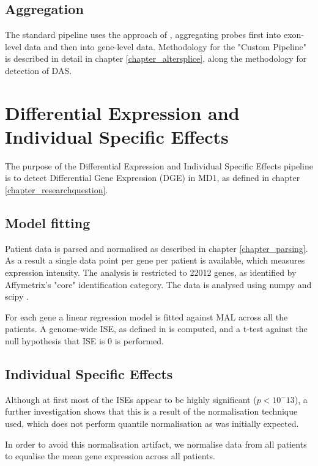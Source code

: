 \subsection{Aggregation}
The standard pipeline uses the approach of \cite{McCall2012}, aggregating probes first into exon-level data and then into gene-level data. Methodology for the "Custom Pipeline" is described in detail in chapter \ref{chapter_altersplice}, along the methodology for detection of DAS.

\section{Differential Expression and Individual Specific Effects} \label {chapter_DE}

The purpose of the Differential Expression and Individual Specific Effects pipeline is to detect Differential Gene Expression (DGE) in MD1, as defined in chapter \ref{chapter_researchquestion}.

\subsection{Model fitting} \label{section_modelfitting}

Patient data is parsed and normalised as described in chapter \ref{chapter_parsing}. As a result a single data point per gene per patient is available, which measures expression intensity. The analysis is restricted to 22012 genes, as identified by Affymetrix's "core" identification category. The data is analysed using numpy and scipy \parencite{Scipy2017}. 

For each gene a linear regression model is fitted against MAL across all the patients. A genome-wide ISE, as defined in \cite{Kurkiewicz2017} is computed, and a t-test against the null hypothesis that ISE is 0 is performed.

\subsection{Individual Specific Effects}

Although at first most of the ISEs appear to be highly significant ($p < 10^-13$), a further investigation shows that this is a result of the normalisation technique used, which does not perform quantile normalisation as was initially expected.

In order to avoid this normalisation artifact, we normalise data from all patients to equalise the mean gene expression across all patients.

